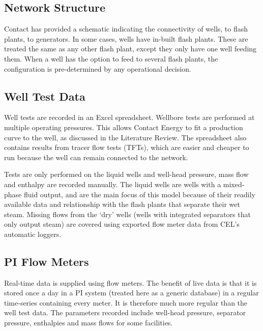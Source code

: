 \documentclass[a4paper, 12pt]{article}
\begin{document}
\subsection{Network Structure}
Contact has provided a schematic indicating the connectivity of wells, to flash plants, to generators. In some cases, wells have in-built flash plants. These are treated the same as any other flash plant, except they only have one well feeding them. When a well has the option to feed to several flash plants, the configuration is pre-determined by any operational decision.

\subsection{Well Test Data}
Well tests are recorded in an Excel spreadsheet. Wellbore tests are performed at multiple operating pressures. This allows Contact Energy to fit a production curve to the well, as discussed in the Literature Review. The spreadsheet also contains results from tracer flow tests (TFTs), which are easier and cheaper to run because the well can remain connected to the network.

Tests are only performed on the liquid wells and well-head pressure, mass flow and enthalpy are recorded manually. The liquid wells are wells with a mixed-phase fluid output, and are the main focus of this model because of their readily available data and relationship with the flash plants that separate their wet steam. 
Missing flows from the `dry' wells (wells with integrated separators that only output steam) are covered using exported flow meter data from  CEL's automatic loggers.

\subsection{PI Flow Meters}
Real-time data is supplied using flow meters. The benefit of live data is that it is stored once a day in a PI system (treated here as a generic database) in a regular time-series containing every meter. It is therefore much more regular than the well test data. The parameters recorded include well-head pressure, separator pressure, enthalpies and mass flows for some facilities.
\end{document}
